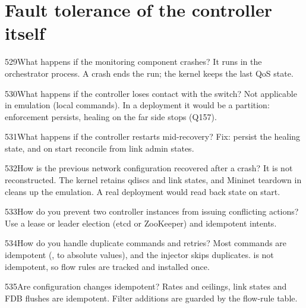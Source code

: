 \section{Fault tolerance of the controller itself}

\begin{qa}{529}{What happens if the monitoring component crashes?}
It runs in the orchestrator process. A crash ends the run; the kernel keeps the last QoS state.
\end{qa}

\begin{qa}{530}{What happens if the controller loses contact with the switch?}
Not applicable in emulation (local commands). In a deployment it would be a partition: enforcement persists, healing
on the far side stops (Q157).
\end{qa}

\begin{qa}{531}{What happens if the controller restarts mid-recovery?}
Fix: persist the healing state, and on start reconcile from link admin states.
\end{qa}

\begin{qa}{532}{How is the previous network configuration recovered after a crash?}
It is not reconstructed. The kernel retains qdiscs and link states, and Mininet teardown in  cleans up
the emulation. A real deployment would read back state on start.
\end{qa}

\begin{qa}{533}{How do you prevent two controller instances from issuing conflicting actions?}
 Use a lease or leader election (etcd or ZooKeeper) and
idempotent intents.
\end{qa}

\begin{qa}{534}{How do you handle duplicate commands and retries?}
Most commands are idempotent (,  to absolute values), and the injector
skips duplicates.  is not idempotent, so flow rules are tracked and installed once.
\end{qa}

\begin{qa}{535}{Are configuration changes idempotent?}
Rates and ceilings, link states and FDB flushes are idempotent. Filter additions are guarded by the flow-rule table.
\end{qa}

